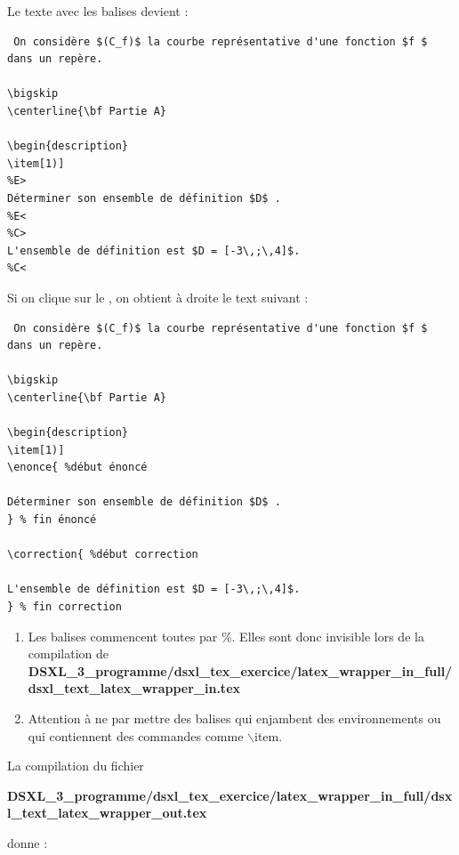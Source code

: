 Le texte avec les balises devient : 
\begin{verbatim}
 On considère $(C_f)$ la courbe représentative d'une fonction $f $ dans un repère.

\bigskip
\centerline{\bf Partie A}

\begin{description}
\item[1)] 
%E>
Déterminer son ensemble de définition $D$ .
%E<
%C>
L'ensemble de définition est $D = [-3\,;\,4]$. 
%C<
\end{verbatim}

Si on clique sur le , on obtient à droite le text suivant : 

\begin{verbatim}
 On considère $(C_f)$ la courbe représentative d'une fonction $f $ dans un repère.

\bigskip
\centerline{\bf Partie A}

\begin{description}
\item[1)] 
\enonce{ %début énoncé 

Déterminer son ensemble de définition $D$ .
} % fin énoncé 

\correction{ %début correction 

L'ensemble de définition est $D = [-3\,;\,4]$. 
} % fin correction 
\end{verbatim}

\begin{remarque}

\begin{enumerate}
 \item  Les balises commencent toutes par \%. Elles sont donc invisible lors de la compilation de \\
 {\bf DSXL\_3\_programme/dsxl\_tex\_exercice/latex\_wrapper\_in\_full/dsxl\_text\_latex\_wrapper\_in.tex}
 \item Attention à ne par mettre des balises qui enjambent des environnements ou qui contiennent des commandes comme $\backslash$item. 
\end{enumerate}


\end{remarque}

La compilation du fichier 

 {\bf DSXL\_3\_programme/dsxl\_tex\_exercice/latex\_wrapper\_in\_full/dsxl\_text\_latex\_wrapper\_out.tex}
 
 donne : 

